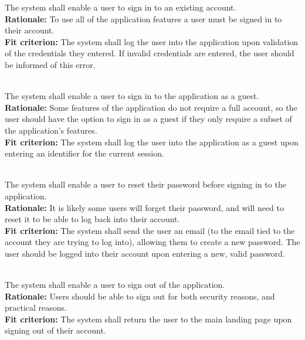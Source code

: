 \documentclass[12pt, titlepage]{article}
\newcounter{FR_Counter}
\begin{document}
The system shall enable a user to sign in to an existing account.\\
\textbf{Rationale:}
To use all of the application features a user must be signed in to their account.\\
\textbf{Fit criterion:}
The system shall log the user into the application upon validation of the credentials they entered. If invalid credentials are entered,
the user should be informed of this error. \\~\\
\addtocounter{FR_Counter}{1}


The system shall enable a user to sign in to the application as a guest.\\
\textbf{Rationale:}
Some features of the application do not require a full account, so the user should have the option to sign in as a guest
if they only require a subset of the application's features.\\
\textbf{Fit criterion:}
The system shall log the user into the application as a guest upon entering an identifier for the current session. \\~\\
\addtocounter{FR_Counter}{1}


The system shall enable a user to reset their password before signing in to the application.\\
\textbf{Rationale:}
It is likely some users will forget their password, and will need to reset it to be able to log back into their account.\\
\textbf{Fit criterion:}
The system shall send the user an email (to the email tied to the account they are trying to log into), allowing them to 
create a new password. The user should be logged into their account upon entering a new, valid password.\\~\\
\addtocounter{FR_Counter}{1}


The system shall enable a user to sign out of the application.\\
\textbf{Rationale:}
Users should be able to sign out for both security reasons, and practical reasons.\\
\textbf{Fit criterion:}
The system shall return the user to the main landing page upon signing out of their account.\\~\\
\addtocounter{FR_Counter}{1}
\end{document}
